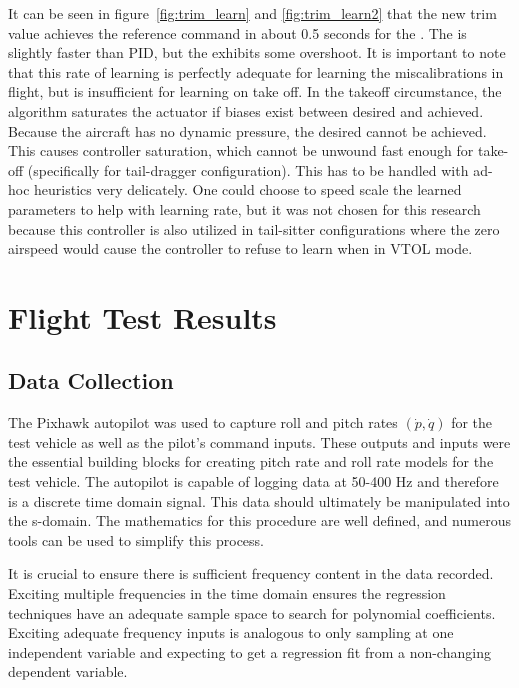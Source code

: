It can be seen in figure~\ref{fig:trim_learn} and \ref{fig:trim_learn2} that the new trim value achieves the reference command in about 0.5 seconds for the \Lone.  The \Lone is slightly faster than \ac{PID}, but the \Lone exhibits some overshoot.  It is important to note that this rate of learning is perfectly adequate for learning the miscalibrations in flight, but is insufficient for learning on take off.  In the takeoff circumstance, the algorithm saturates the actuator if biases exist between desired and achieved.  Because the aircraft has no dynamic pressure, the desired cannot be achieved.  This causes controller saturation, which cannot be unwound fast enough for take-off (specifically for tail-dragger configuration).  This has to be handled with ad-hoc heuristics very delicately.  One could choose to speed scale the learned parameters to help with learning rate, but it was not chosen for this research because this controller is also utilized in tail-sitter configurations where the zero airspeed would cause the controller to refuse to learn when in \ac{VTOL} mode.

\section{Flight Test Results}\label{sec:flight_test}

\subsection{Data Collection}
The Pixhawk autopilot was used to capture roll and pitch rates $(\dot{p},\dot{q})$ for the test vehicle as well as the pilot's command inputs.  These outputs and inputs were the essential building blocks for creating pitch rate and roll rate models for the test vehicle.  The autopilot is capable of logging data at 50-400 Hz and therefore is a discrete time domain signal.  This data should ultimately be manipulated into the s-domain.  The mathematics for this procedure are well defined, and numerous tools can be used to simplify this process.  

It is crucial to ensure there is sufficient frequency content in the data recorded.  Exciting multiple frequencies in the time domain ensures the regression techniques have an adequate sample space to search for polynomial coefficients.  Exciting adequate frequency inputs is analogous to only sampling at one independent variable and expecting to get a regression fit from a non-changing dependent variable.  

